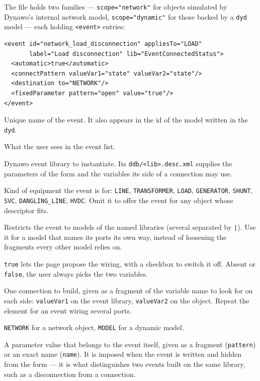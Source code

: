 \documentclass[a4paper,11pt]{article}
\newcommand{\code}[1]{\texttt{\small #1}}
\newcommand{\ftype}[1]{\texttt{\small\color{rteblu}#1}}
\begin{document}
The file holds two families --- \code{scope="network"} for objects simulated by
Dynawo's internal network model, \code{scope="dynamic"} for those backed by a
\ftype{dyd} model --- each holding \code{<event>} entries:

\begin{lstlisting}
<event id="network_load_disconnection" appliesTo="LOAD"
       label="Load disconnection" lib="EventConnectedStatus">
  <automatic>true</automatic>
  <connectPattern valueVar1="state" valueVar2="state"/>
  <destination to="NETWORK"/>
  <fixedParameter pattern="open" value="true"/>
</event>
\end{lstlisting}

\begin{description}[leftmargin=2em]
  \item[\code{id}] Unique name of the event. It also appears in the id of the
    model written in the \ftype{dyd}.
  \item[\code{label}] What the user sees in the event list.
  \item[\code{lib}] Dynawo event library to instantiate. Its
    \code{ddb/<lib>.desc.xml} supplies the parameters of the form and the
    variables its side of a connection may use.
  \item[\code{appliesTo}] Kind of equipment the event is for: \code{LINE},
    \code{TRANSFORMER}, \code{LOAD}, \code{GENERATOR}, \code{SHUNT},
    \code{SVC}, \code{DANGLING\_LINE}, \code{HVDC}. Omit it to offer the event
    for any object whose descriptor fits.
  \item[\code{forLib}] Restricts the event to models of the named libraries
    (several separated by \code{|}). Use it for a model that names its ports
    its own way, instead of loosening the fragments every other model relies on.
  \item[\code{<automatic>}] \code{true} lets the page propose the wiring, with
    a checkbox to switch it off. Absent or \code{false}, the user always picks
    the two variables.
  \item[\code{<connectPattern>}] One connection to build, given as a fragment
    of the variable name to look for on each side: \code{valueVar1} on the
    event library, \code{valueVar2} on the object. Repeat the element for an
    event wiring several ports.
  \item[\code{<destination>}] \code{NETWORK} for a network object,
    \code{MODEL} for a dynamic model.
  \item[\code{<fixedParameter>}] A parameter value that belongs to the event
    itself, given as a fragment (\code{pattern}) or an exact name
    (\code{name}). It is imposed when the event is written and hidden from the
    form --- it is what distinguishes two events built on the same library,
    such as a disconnection from a connection.
\end{description}
\end{document}
